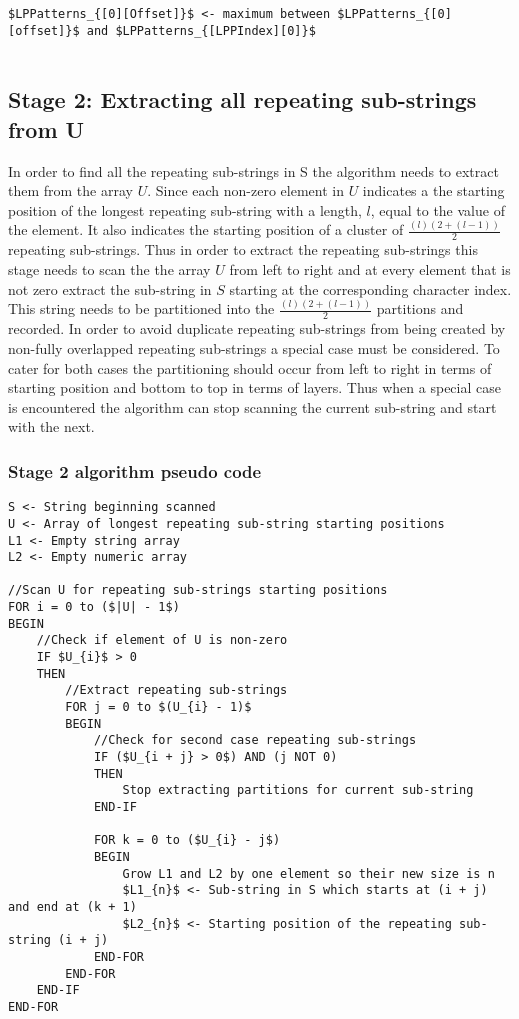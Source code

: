 \documentclass[12pt]{article}
\begin{document}
\begin{flushleft}
\begin{lstlisting}
$LPPatterns_{[0][Offset]}$ <- maximum between $LPPatterns_{[0][offset]}$ and $LPPatterns_{[LPPIndex][0]}$


\end{lstlisting}
	\newpage	
	\subsection{Stage 2: Extracting all repeating sub-strings from U}
		
	In order to find all the repeating sub-strings in S the algorithm needs to extract them from the array $U$. Since each non-zero element in $U$ indicates a the starting position of the longest repeating sub-string with a length, $l$, equal to the value of the element. It also indicates the starting position of a cluster of $\frac{(l)(2 + (l-1))}{2}$ repeating sub-strings. Thus in order to extract the repeating sub-strings this stage needs to scan the the array $U$ from left to right and at every element that is not zero extract the sub-string in $S$ starting at the corresponding character index. This string needs to be partitioned into the $\frac{(l)(2 + (l-1))}{2}$ partitions and recorded. In order to avoid duplicate repeating sub-strings from being created by non-fully overlapped repeating sub-strings a special case must be considered. To cater for both cases the partitioning should occur from left to right in terms of starting position and bottom to top in terms of layers. Thus when a special case is encountered the algorithm can stop scanning the current sub-string and start with the next.
	\newpage
	\subsubsection{Stage 2 algorithm pseudo code}

\begin{lstlisting}
S <- String beginning scanned
U <- Array of longest repeating sub-string starting positions
L1 <- Empty string array
L2 <- Empty numeric array

//Scan U for repeating sub-strings starting positions 
FOR i = 0 to ($|U| - 1$)  
BEGIN			                
	//Check if element of U is non-zero
	IF $U_{i}$ > 0 
	THEN
		//Extract repeating sub-strings
		FOR j = 0 to $(U_{i} - 1)$ 
		BEGIN                  
			//Check for second case repeating sub-strings
			IF ($U_{i + j} > 0$) AND (j NOT 0) 
			THEN
				Stop extracting partitions for current sub-string
			END-IF
			
			FOR k = 0 to ($U_{i} - j$)
			BEGIN                               
				Grow L1 and L2 by one element so their new size is n
				$L1_{n}$ <- Sub-string in S which starts at (i + j) and end at (k + 1)
				$L2_{n}$ <- Starting position of the repeating sub-string (i + j)
			END-FOR
		END-FOR
	END-IF	
END-FOR		
\end{lstlisting}
	\newpage	

\end{flushleft}
\end{document}
